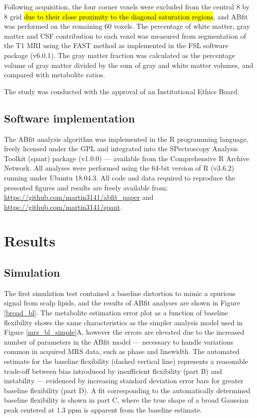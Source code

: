 \documentclass[num-refs]{wiley-article}
\newcommand{\revone}[2]{\hl{#1}\marginnote{\hl{#2}}}
\begin{document}
Following acquisition, the four corner voxels were excluded from the central 8 by 8 grid \revone{due to their close proximity to the diagonal saturation regions}{R1.24}, and ABfit was performed on the remaining 60 voxels. The percentage of white matter, gray matter and CSF contribution to each voxel was measured from segmentation of the T1 MRI using the FAST method \cite{Zhang2001} as implemented in the FSL software package (v6.0.1). The gray matter fraction was calculated as the percentage volume of gray matter divided by the sum of gray and white matter volumes, and compared with metabolite ratios.

The study was conducted with the approval of an Institutional Ethics Board.

\subsection{Software implementation}
The ABfit analysis algorithm was implemented in the R \cite{R2019} programming language, freely licensed under the GPL and integrated into the SPectroscopy Analysis Toolkit (spant) package (v1.0.0) --- available from the Comprehensive R Archive Network. All analyses were performed using the 64-bit version of R (v3.6.2) running under Ubuntu 18.04.3. All code and data required to reproduce the presented figures and results are freely available from:\\ \url{https://github.com/martin3141/abfit_paper} and
\url{https://github.com/martin3141/spant}.

\section{Results}
\subsection{Simulation}
The first simulation test contained a baseline distortion to mimic a spurious signal from scalp lipids, and the results of ABfit analyses are shown in Figure \ref{broad_bl}. The metabolite estimation error plot as a function of baseline flexibility shows the same characteristics as the simpler analysis model used in Figure \ref{mrs_bl_simple}A, however the errors are elevated due to the increased number of parameters in the ABfit model --- necessary to handle variations common in acquired MRS data, such as phase and linewidth. The automated estimate for the baseline flexibility (dashed vertical line) represents a reasonable trade-off between bias introduced by insufficient flexibility (part B) and instability --- evidenced by increasing standard deviation error bars for greater baseline flexibility (part D). A fit corresponding to the automatically determined baseline flexibility is shown in part C, where the true shape of a broad Gaussian peak centered at 1.3 ppm is apparent from the baseline estimate.
\end{document}
